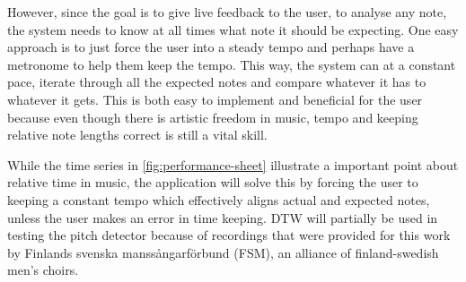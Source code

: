 However, since the goal is to give live feedback to the user, to analyse any note, the system needs to know at all times what note it should be expecting. One easy approach is to just force the user into a steady tempo and perhaps have a metronome to help them keep the tempo. This way, the system can at a constant pace, iterate through all the expected notes and compare whatever it has to whatever it gets. This is both easy to implement and beneficial for the user because even though there is artistic freedom in music, tempo and keeping relative note lengths correct is still a vital skill. 

While the time series in \ref{fig:performance-sheet} illustrate a important point about relative time in music, the application will solve this by forcing the user to keeping a constant tempo which effectively aligns actual and expected notes, unless the user makes an error in time keeping. DTW will partially be used in testing the pitch detector because of recordings that were provided for this work by Finlands svenska manssångarförbund (FSM), an alliance of finland-swedish men's choirs. 
